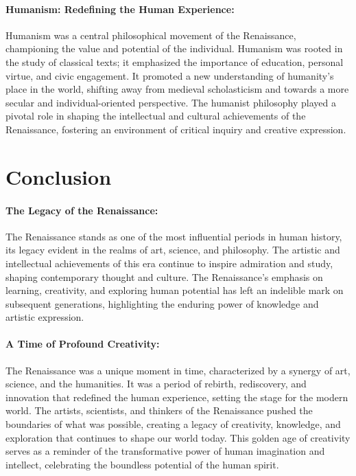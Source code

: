 \documentclass{book}
\begin{document}
\paragraph{Humanism: Redefining the Human Experience:}
Humanism was a central philosophical movement of the Renaissance, championing the value and potential of the individual. Humanism was rooted in the study of classical texts; it emphasized the importance of education, personal virtue, and civic engagement. It promoted a new understanding of humanity’s place in the world, shifting away from medieval scholasticism and towards a more secular and individual-oriented perspective. The humanist philosophy played a pivotal role in shaping the intellectual and cultural achievements of the Renaissance, fostering an environment of critical inquiry and creative expression.

\section*{Conclusion}

\paragraph{The Legacy of the Renaissance:}
The Renaissance stands as one of the most influential periods in human history, its legacy evident in the realms of art, science, and philosophy. The artistic and intellectual achievements of this era continue to inspire admiration and study, shaping contemporary thought and culture. The Renaissance’s emphasis on learning, creativity, and exploring human potential has left an indelible mark on subsequent generations, highlighting the enduring power of knowledge and artistic expression.

\paragraph{A Time of Profound Creativity:}
The Renaissance was a unique moment in time, characterized by a synergy of art, science, and the humanities. It was a period of rebirth, rediscovery, and innovation that redefined the human experience, setting the stage for the modern world. The artists, scientists, and thinkers of the Renaissance pushed the boundaries of what was possible, creating a legacy of creativity, knowledge, and exploration that continues to shape our world today. This golden age of creativity serves as a reminder of the transformative power of human imagination and intellect, celebrating the boundless potential of the human spirit.
\end{document}
